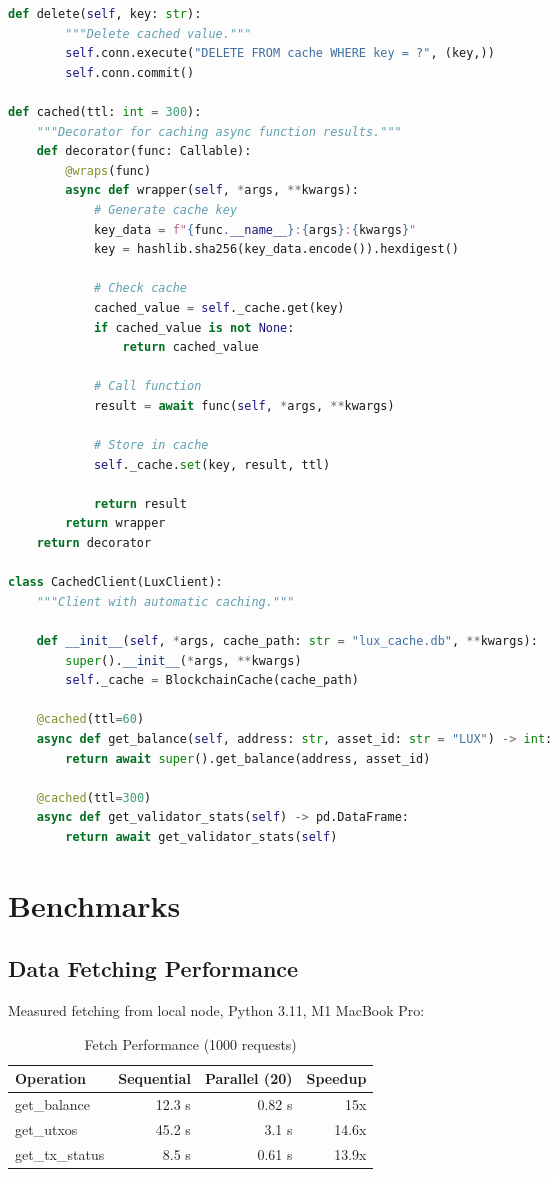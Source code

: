 \documentclass[11pt,twocolumn]{article}
\begin{document}
\begin{lstlisting}[language=Python,caption=Caching Layer]
    def delete(self, key: str):
        """Delete cached value."""
        self.conn.execute("DELETE FROM cache WHERE key = ?", (key,))
        self.conn.commit()

def cached(ttl: int = 300):
    """Decorator for caching async function results."""
    def decorator(func: Callable):
        @wraps(func)
        async def wrapper(self, *args, **kwargs):
            # Generate cache key
            key_data = f"{func.__name__}:{args}:{kwargs}"
            key = hashlib.sha256(key_data.encode()).hexdigest()

            # Check cache
            cached_value = self._cache.get(key)
            if cached_value is not None:
                return cached_value

            # Call function
            result = await func(self, *args, **kwargs)

            # Store in cache
            self._cache.set(key, result, ttl)

            return result
        return wrapper
    return decorator

class CachedClient(LuxClient):
    """Client with automatic caching."""

    def __init__(self, *args, cache_path: str = "lux_cache.db", **kwargs):
        super().__init__(*args, **kwargs)
        self._cache = BlockchainCache(cache_path)

    @cached(ttl=60)
    async def get_balance(self, address: str, asset_id: str = "LUX") -> int:
        return await super().get_balance(address, asset_id)

    @cached(ttl=300)
    async def get_validator_stats(self) -> pd.DataFrame:
        return await get_validator_stats(self)
\end{lstlisting}

\section{Benchmarks}

\subsection{Data Fetching Performance}

Measured fetching from local node, Python 3.11, M1 MacBook Pro:

\begin{table}[h]
\centering
\caption{Fetch Performance (1000 requests)}
\begin{tabular}{lrrr}
\toprule
\textbf{Operation} & \textbf{Sequential} & \textbf{Parallel (20)} & \textbf{Speedup} \\
\midrule
get\_balance & 12.3 s & 0.82 s & 15x \\
get\_utxos & 45.2 s & 3.1 s & 14.6x \\
get\_tx\_status & 8.5 s & 0.61 s & 13.9x \\
\bottomrule
\end{tabular}
\end{table}
\end{document}

